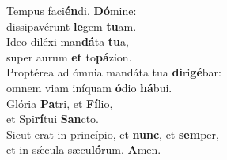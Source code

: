 \evenverse Tempus faci\textbf{én}di, \textbf{Dó}mine:~\*\\
\evenverse dissipavérunt \textbf{le}gem \textbf{tu}am.\\
\oddverse Ideo diléxi man\textbf{dá}ta \textbf{tu}a,~\*\\
\oddverse super aurum \textbf{et} to\textbf{pá}zion.\\
\evenverse Proptérea ad ómnia mandáta tua \textbf{di}ri\textbf{gé}bar:~\*\\
\evenverse omnem viam iníquam \textbf{ó}dio \textbf{há}bui.\\
\oddverse Glória \textbf{Pa}tri, et \textbf{Fí}lio,~\*\\
\oddverse et Spi\textbf{rí}tui \textbf{San}cto.\\
\evenverse Sicut erat in princípio, et \textbf{nunc}, et \textbf{sem}per,~\*\\
\evenverse et in sǽcula sæcu\textbf{ló}rum. \textbf{A}men.\\
